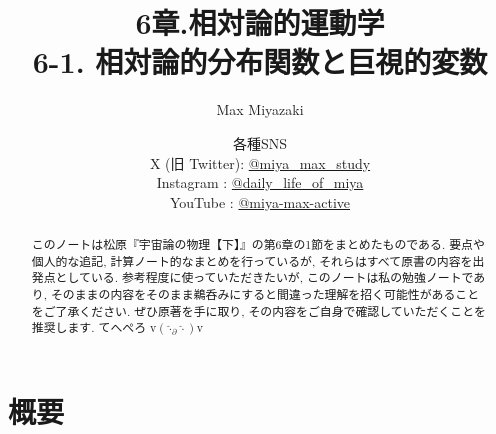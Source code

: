 \documentclass[a4paper,12pt]{article}
\title{6章.相対論的運動学\\
6-1. 相対論的分布関数と巨視的変数}
\date{各種SNS\\
    X (旧 Twitter): \href{https://x.com/miya_max_study}{@miya\_max\_study}\\
    Instagram : \href{https://www.instagram.com/daily_life_of_miya/}{@daily\_life\_of\_miya}\\
    YouTube : \href{https://www.youtube.com/@miya-max-active}{@miya-max-active}
    }
\author{Max Miyazaki}
\begin{document}
\maketitle

\vspace{1cm}
\begin{abstract}
    このノートは松原『宇宙論の物理【下】』の第6章の1節をまとめたものである. 要点や個人的な追記, 計算ノート的なまとめを行っているが, それらはすべて原書の内容を出発点としている. 参考程度に使っていただきたいが, このノートは私の勉強ノートであり, そのままの内容をそのまま鵜呑みにすると間違った理解を招く可能性があることをご了承ください. ぜひ原著を手に取り, その内容をご自身で確認していただくことを推奨します. てへぺろ v$({\hat{\cdot}_\partial \hat{\cdot}})$v
\end{abstract}
    
    

\newpage
\color{blue}
\section*{概要}
\end{document}

